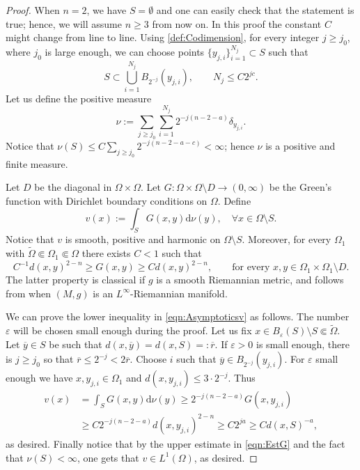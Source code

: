 \documentclass[12pt,a4paper,reqno]{amsart}
\renewcommand{\leq}{\leqslant}
\renewcommand{\geq}{\geqslant}
\renewcommand{\bar}{\overline}
\begin{document}
\begin{proof}
    When $n=2$, we have $S=\emptyset$ and one can easily check that the statement is true; hence, we will assume $n\geq 3$ from now on. In this proof the constant $C$ might change from line to line. Using \cref{def:Codimension}, for every integer $j\geq j_0$, where $j_0$ is large enough, we can choose points $\{y_{j,i}\}_{i=1}^{N_j}\subset S$ such that 
    \[
    S\subset \bigcup_{i=1}^{N_j} B_{2^{-j}}(y_{j,i}), \qquad N_j\leq C2^{jc}.
    \]
    Let us define the positive measure
    \[
    \nu:=\sum_{j\geq j_0}\sum_{i=1}^{N_j} 2^{-j(n-2-a)}\delta_{y_{j,i}}.
    \]
    Notice that $\nu(S)\leq C\sum_{j\geq j_0} 2^{-j(n-2-a-c)}<\infty$; hence $\nu$ is a positive and finite measure.
    
    Let $D$ be the diagonal in $\Omega\times \Omega$. Let $G:\Omega\times \Omega\setminus D\to (0,\infty)$ be the Green's function with Dirichlet boundary conditions on $\Omega$. Define
    \begin{equation}\label{eqn:DefinitionNu}
    v(x):=\int_{S} G(x,y)\mathrm{d}\nu(y), \quad \forall x\in \Omega\setminus S.
    \end{equation}
    Notice that $v$ is smooth, positive and harmonic on $\Omega\setminus S$. Moreover, for every $\Omega_1$ with $\widetilde\Omega\Subset \Omega_1\Subset\Omega$ there exists $C<1$ such that 
    \begin{equation}\label{eqn:EstG}
    C^{-1}d(x,y)^{2-n}\geq G(x,y)\geq Cd(x,y)^{2-n}, \qquad \text{for every $x,y\in \Omega_1\times\Omega_1\setminus D$}.
    \end{equation}
    The latter property is classical if $g$ is a smooth Riemannian metric, and follows from \cite[Theorem 7.1]{LittmanStampacchiaWeinberger} when $(M,g)$ is an $L^\infty$-Riemannian manifold. 
    
    We can prove the lower inequality in \eqref{eqn:Asymptoticsv} as follows. The number $\varepsilon$ will be chosen small enough during the proof. Let us fix $x\in B_{\varepsilon}(S)\setminus S\Subset\widetilde\Omega$. Let $\bar y\in S$ be such that $d(x,\bar y)=d(x,S)=:\bar r$. If $\varepsilon>0$ is small enough, there is $j\geq j_0$ so that $\bar r\leq 2^{-j}<2\bar r$. Choose $i$ such that $\bar y\in B_{2^{-j}}(y_{j,i})$. For $\varepsilon$ small enough we have $x,y_{j,i}\in\Omega_1$ and $d(x,y_{j,i})\leq 3\cdot 2^{-j}$.
    Thus
    \begin{equation}
    \begin{aligned}
        v(x)&=\int_S G(x,y)\mathrm{d}\nu(y) \geq 2^{-j(n-2-a)}G(x,y_{j,i}) \\
        &\geq C 2^{-j(n-2-a)}d(x,y_{j,i})^{2-n} \geq C2^{ja}\geq Cd(x,S)^{-a},
    \end{aligned}
    \end{equation}
    as desired. Finally notice that by the upper estimate in \eqref{eqn:EstG} and the fact that $\nu(S)<\infty$, one gets that $v\in L^1(\Omega)$, as desired.
\end{proof}
\end{document}
